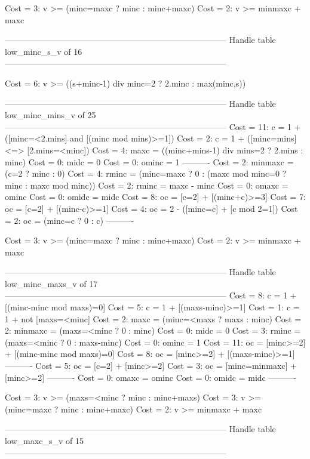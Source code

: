 Cost =  3:  v >= (minc=maxc ? minc : minc+maxc)
Cost =  2:  v >= minmaxc + maxc

--------------------------------------------------------------------------------
Handle table low_minc_s_v of 16
--------------------------------------------------------------------------------

Cost =  6:  v >= ((s+minc-1) div minc=2 ? 2.minc : max(minc,s))

--------------------------------------------------------------------------------
Handle table low_minc_mins_v of 25
--------------------------------------------------------------------------------
Cost = 11:  c       = 1 + ([minc=<2.mins] and [(minc mod mins)>=1])
Cost =  2:  c       = 1 + ([minc=mins] <=> [2.mins=<minc])
Cost =  4:  maxc    = ((minc+mins-1) div mins=2 ? 2.mins : minc)
Cost =  0:  midc    = 0
Cost =  0:  ominc   = 1
----------
Cost =  2:  minmaxc = (c=2 ? minc : 0)
Cost =  4:  rminc   = (minc=maxc ? 0 : (maxc mod minc=0 ? minc : maxc mod minc))
Cost =  2:  rminc   = maxc - minc
Cost =  0:  omaxc   = ominc
Cost =  0:  omidc   = midc
Cost =  8:  oc      = [c=2] + [(minc+c)>=3]
Cost =  7:  oc      = [c=2] + [(minc-c)>=1]
Cost =  4:  oc      = 2 - ([minc=c] + [c mod 2=1])
Cost =  2:  oc      = (minc=c ? 0 : c)
----------

Cost =  3:  v >= (minc=maxc ? minc : minc+maxc)
Cost =  2:  v >= minmaxc + maxc

--------------------------------------------------------------------------------
Handle table low_minc_maxs_v of 17
--------------------------------------------------------------------------------
Cost =  8:  c       = 1 + [(minc-minc mod maxs)=0]
Cost =  5:  c       = 1 + [(maxs-minc)>=1]
Cost =  1:  c       = 1 + not [maxs=<minc]
Cost =  2:  maxc    = (minc=<maxs ? maxs : minc)
Cost =  2:  minmaxc = (maxs=<minc ? 0 : minc)
Cost =  0:  midc    = 0
Cost =  3:  rminc   = (maxs=<minc ? 0 : maxs-minc)
Cost =  0:  ominc   = 1
Cost = 11:  oc      = [minc>=2] + [(minc-minc mod maxs)=0]
Cost =  8:  oc      = [minc>=2] + [(maxs-minc)>=1]
----------
Cost =  5:  oc      = [c=2] + [minc>=2]
Cost =  3:  oc      = [minc=minmaxc] + [minc>=2]
----------
Cost =  0:  omaxc   = ominc
Cost =  0:  omidc   = midc
----------

Cost =  3:  v >= (maxs=<minc ? minc : minc+maxs)
Cost =  3:  v >= (minc=maxc ? minc : minc+maxc)
Cost =  2:  v >= minmaxc + maxc

--------------------------------------------------------------------------------
Handle table low_maxc_s_v of 15
--------------------------------------------------------------------------------

